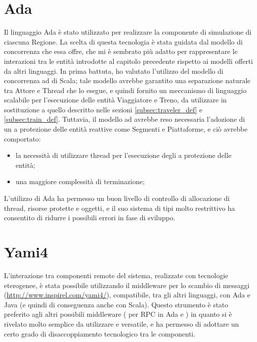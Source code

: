 	\section{Ada}
		Il linguaggio Ada è stato utilizzato per realizzare la componente di simulazione di ciascuna Regione. La scelta di questa tecnologia è stata guidata dal modello di concorrenza che essa offre, che mi è sembrato più adatto per rappresentare le interazioni tra le entità introdotte al capitolo precedente rispetto ai modelli offerti da altri linguaggi. 
		In prima battuta, ho valutato l'utilizzo del modello di concorrenza ad  di Scala; tale modello avrebbe garantito una separazione naturale tra Attore e Thread che lo esegue, e quindi fornito un meccanismo di linguaggio scalabile per l'esecuzione delle entità Viaggiatore e Treno, da utilizzare in sostituzione a quello descritto nelle sezioni \ref{subsec:traveler_def} e \ref{subsec:train_def}. Tuttavia, il modello ad  avrebbe reso necessaria l'adozione di un  a protezione delle entità reattive come Segmenti e Piattaforme, e ciò avrebbe comportato:
			\begin{itemize}
				\item la necessità di utilizzare thread per l'esecuzione degli  a protezione delle entità;
				\item una maggiore complessità di terminazione;
			\end{itemize}
		L'utilizzo di Ada ha permesso un buon livello di controllo di allocazione di thread, risorse protette e oggetti, e il suo sistema di tipi molto restrittivo ha consentito di ridurre i possibili errori in fase di sviluppo.
	
	\section{Yami4}
L'interazione tra componenti remote del sistema, realizzate con tecnologie eterogenee, è stata possibile utilizzando il middleware per lo scambio di messaggi  (\url{http://www.inspirel.com/yami4/}), compatibile, tra gli altri linguaggi, con Ada e Java (e quindi di conseguenza anche con Scala). Questo strumento è stato preferito agli altri possibili middleware ( per RPC in Ada e ) in quanto si è rivelato molto semplice da utilizzare e versatile, e ha permesso di adottare un certo grado di disaccoppiamento tecnologico tra le componenti. 

